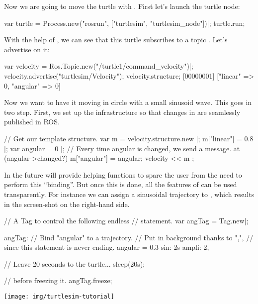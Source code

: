 Now we are going to move the turtle with \urbi. First let's launch the
turtle node:

\begin{urbiunchecked}
var turtle = Process.new("rosrun", ["turtlesim", "turtlesim_node"])|;
turtle.run;
\end{urbiunchecked}

With the help of , we can see that this turtle
subscribes to a topic . Let's advertise on
it:

\begin{urbiunchecked}
var velocity = Ros.Topic.new("/turtle1/command_velocity")|;
velocity.advertise("turtlesim/Velocity");
velocity.structure;
[00000001] ["linear" => 0, "angular" => 0]
\end{urbiunchecked}


Now we want to have it moving in circle with a small sinusoid wave.  This
goes in two step.  First, we set up the infrastructure so that changes in
\urbi are seamlessly published in ROS.

\begin{urbiunchecked}
// Get our template structure.
var m = velocity.structure.new |;
m["linear"] = 0.8 |;
var angular = 0 |;
// Every time angular is changed, we send a message.
at (angular->changed?)
{
  m["angular"] = angular;
  velocity << m
};
\end{urbiunchecked}

\noindent
In the future \urbi will provide helping functions to spare the user from
the need to perform this ``binding''.  But once this is done, all the
features of \us can be used transparently.  For instance we can assign a
sinusoidal trajectory to , which results in the screen-shot on
the right-hand side.

\begin{multicols}{2}
\begin{urbiunchecked}
// A Tag to control the following endless
// statement.
var angTag = Tag.new|;

angTag:
  // Bind "angular" to a trajectory.
  // Put in background thanks to ",",
  // since this statement is never ending.
  angular = 0.3 sin: 2s ampli: 2,

// Leave 20 seconds to the turtle...
sleep(20s);

// before freezing it.
angTag.freeze;
\end{urbiunchecked}

\columnbreak

\begin{center}
  \texttt{[image: img/turtlesim-tutorial]}
\end{center}

\end{multicols}

